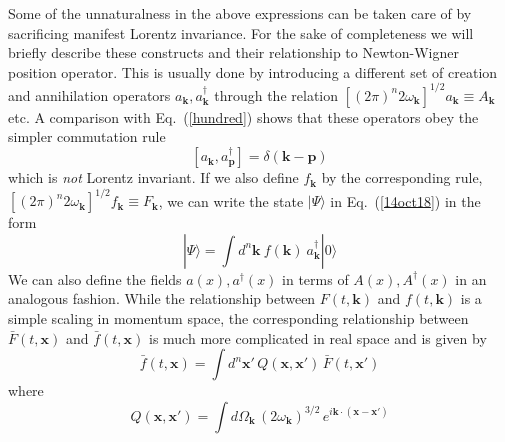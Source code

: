 \documentclass{article}
\def\eq#1{{Eq.~(\ref{#1})}}
\def\ket#1{|#1\rangle}                    %
\begin{document}
Some of the  unnaturalness in the above expressions can be taken care of by sacrificing manifest Lorentz invariance.
 For the sake of completeness we will briefly describe these constructs and their relationship to Newton-Wigner position operator.
This is usually done by introducing a different set of creation and annihilation operators $a_{\bm{k}}, a^\dagger_{\bm{k}}$ through the relation 
 $
 [(2\pi)^n 2\omega_{\bm{k}}]^{1/2} a_{\bm{k}} \equiv A_{\bm{k}}
 $ 
 etc. A comparison with \eq{hundred} shows that these operators obey the simpler commutation rule 
 \begin{equation}
 \left[ a_{\bm{k}}, a^\dagger_{\bm{p}}\right] = \delta (\bm{k} - \bm{p})
 \end{equation} 
 which is \textit{not} Lorentz invariant. If we also define $f_{\bm{k}}$ by the corresponding rule, 
 $
 [(2\pi)^n 2\omega_{\bm{k}}]^{1/2} f_{\bm{k}} \equiv F_{\bm{k}}
 $, 
 we can write the state $\ket{\Psi}$ in \eq{14oct18} in the form 
 \begin{equation}
 \ket{\Psi} = \int d^n \bm{k}\ f(\bm{k})\ a^\dagger_{\bm{k}} \ket{0}
 \end{equation} 
 We can also define the fields $a(x), a^\dagger(x)$ in terms of $A(x), A^\dagger(x)$ in an analogous fashion. 
 While the relationship between $F(t, \bm{k})$ and $f(t, \bm{k})$ is a simple scaling in momentum space, the corresponding relationship between $\bar F(t, \bm{x})$ and $\bar f(t, \bm{x})$ is much more complicated in real space and is given by
 \begin{equation}
 \bar f(t,\bm{x}) = \int d^n \bm{x}' \, Q(\bm{x}, \bm{x}')\, \bar F(t, \bm{x}')
 \end{equation} 
 where 
 \begin{equation}
 Q(\bm{x}, \bm{x}') = \int d\Omega_{\bm{k}} \, (2\omega_{\bm{k}})^{3/2}\, e^{i\bm{k}\cdot (\bm{x}-\bm{x}')}
 \end{equation} 
 
\end{document}
